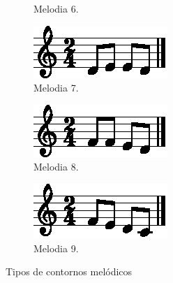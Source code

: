 \begin{figure}[!h]
\begin{subfigure}[b]{0.3\textwidth}
         \caption{Melodia 6.}
         \label{fig:melodia-chars-shape-6-1}
     \end{subfigure}
     \hfill
     \begin{subfigure}[b]{0.3\textwidth}
         \centering
         \includegraphics[width=\textwidth]{chapters/cap-musicalidade-percepcion/melodia-chars-shape-7-1.eps}
         \caption{Melodia 7.}
         \label{fig:melodia-chars-shape-7-1}
     \end{subfigure}
     \hfill
     \begin{subfigure}[b]{0.3\textwidth}
         \centering
         \includegraphics[width=\textwidth]{chapters/cap-musicalidade-percepcion/melodia-chars-shape-8-1.eps}
         \caption{Melodia 8.}
         \label{fig:melodia-chars-shape-8-1}
     \end{subfigure}
     \hfill
     \begin{subfigure}[b]{0.3\textwidth}
         \centering
         \includegraphics[width=\textwidth]{chapters/cap-musicalidade-percepcion/melodia-chars-shape-9-1.eps}
         \caption{Melodia 9.}
         \label{fig:melodia-chars-shape-9-1}
     \end{subfigure}
     \hfill
        \caption{Tipos de contornos melódicos}
        \label{fig:9melodias}
\end{figure}



